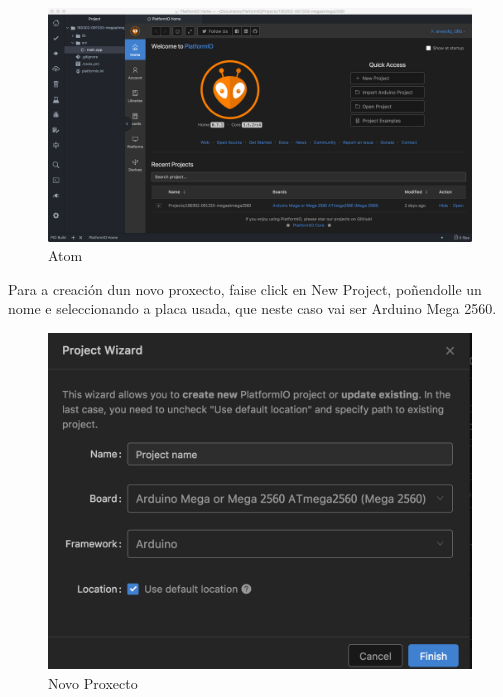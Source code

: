 \documentclass[11pt,twoside]{book}
\begin{document}
\begin{figure}[H]
	\begin{center}
		\includegraphics[width=15cm]{images/Atom.png}
	\end{center}
	\caption{Atom}
	\label{fig:Atom}
\end{figure}

Para a creación dun novo proxecto, faise click en New Project, poñendolle un nome e seleccionando a placa usada, que neste caso vai ser Arduino Mega 2560.

\begin{figure}[H]
	\begin{center}
		\includegraphics[width=15cm]{images/NewProject.png}
	\end{center}
	\caption{Novo Proxecto}
	\label{fig:NewProject}
\end{figure}
\end{document}
